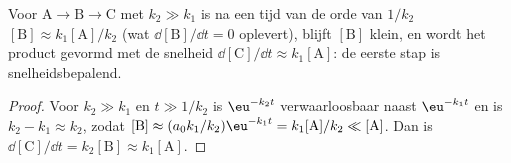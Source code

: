 \begin{proposition}\label{prop:b1:elementary-steps:qssa-justified}
Voor $\mathrm{A} \to \mathrm{B} \to \mathrm{C}$ met $k_2 \gg k_1$ is na
een tijd van de orde van $1/k_2$ $[\mathrm{B}] \approx k_1[\mathrm{A}]/k_2$
(wat $\dd[\mathrm{B}]/\dd t = 0$ oplevert), blijft $[\mathrm{B}]$ klein,
en wordt het product gevormd met de snelheid
$\dd[\mathrm{C}]/\dd t \approx k_1[\mathrm{A}]$: de eerste stap is
snelheidsbepalend.
\end{proposition}

\begin{proof}
Voor $k_2 \gg k_1$ en $t \gg 1/k_2$ is $\eu^{-k_2t}$ verwaarloosbaar naast
$\eu^{-k_1t}$ en is $k_2 - k_1 \approx k_2$, zodat $[\mathrm{B}] \approx (a_0k_1/k_2)
\eu^{-k_1t} = k_1[\mathrm{A}]/k_2 \ll [\mathrm{A}]$. Dan is
$\dd[\mathrm{C}]/\dd t = k_2[\mathrm{B}] \approx k_1[\mathrm{A}]$.
\end{proof}

